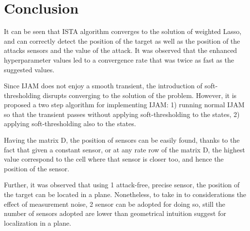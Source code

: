 \section{Conclusion}
It can be seen that ISTA algorithm converges to the solution of weighted Lasso, and can correctly detect the position of the target as well as the position of the attacks sensors and the value of the attack. It was observed that the enhanced hyperparameter values led to a convergence rate that was twice as fast as the suggested values.

Since IJAM does not enjoy a smooth transient, the introduction of soft-thresholding disrupts converging to the solution of the problem. However, it is proposed a two step algorithm for implementing IJAM: 1) running normal IJAM so that the transient passes without applying soft-thresholding to the states, 2) applying soft-thresholding also to the states.

Having the matrix D, the position of sensors can be easily found, thanks to the fact that given a constant sensor, or at any rate row of the matrix D, the highest value correspond to the cell where that sensor is closer too, and hence the position of the sensor.

Further, it was observed that using 1 attack-free, precise sensor, the position of the target can be located in a plane. Nonetheless, to take in to considerations the effect of measurement noise, 2 sensor can be adopted for doing so, still the number of sensors adopted are lower than geometrical intuition suggest for localization in a plane.








